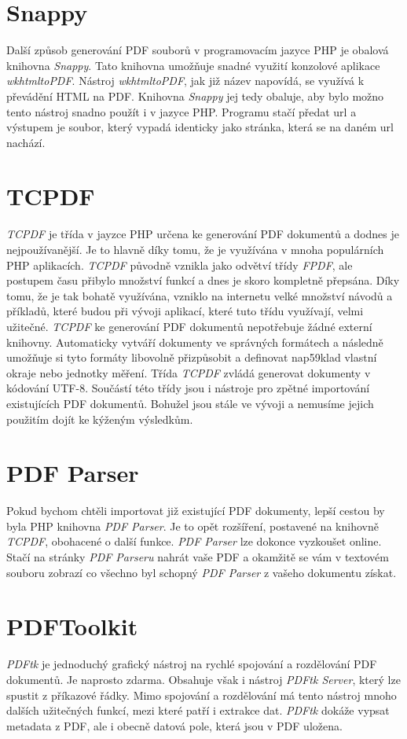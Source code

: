 \documentclass[czech,BP]{thesiskiv}
\begin{document}
\section{Snappy}
Další způsob generování PDF souborů v programovacím jazyce PHP je obalová knihovna \emph{Snappy}. Tato knihovna umožňuje snadné využití konzolové aplikace \emph{wkhtmltoPDF}. Nástroj \emph{wkhtmltoPDF}, jak již název napovídá, se využívá k převádění HTML na PDF. Knihovna \emph{Snappy} jej tedy obaluje, aby bylo možno tento nástroj snadno použít i v jazyce PHP. Programu stačí předat url a výstupem je soubor, který vypadá identicky jako stránka, která se na daném url nachází\cite{Snappy}\cite{wkhtmltoPDF}.
\section{TCPDF}
\emph{TCPDF} je třída v jayzce PHP určena ke generování PDF dokumentů a dodnes je nejpoužívanější. Je to hlavně díky tomu, že je využívána v mnoha populárních PHP aplikacích. \emph{TCPDF} původně vznikla jako odvětví třídy \emph{FPDF}, ale postupem času přibylo množství funkcí a dnes je skoro kompletně přepsána. Díky tomu, že je tak bohatě využívána, vzniklo na internetu velké množství návodů a příkladů, které budou při vývoji aplikací, které tuto třídu využívají, velmi užitečné. \emph{TCPDF} ke generování PDF dokumentů nepotřebuje žádné externí knihovny. Automaticky vytváří dokumenty ve správných formátech a následně umožňuje si tyto formáty libovolně přizpůsobit a definovat nap59klad vlastní okraje nebo jednotky měření. Třída \emph{TCPDF} zvládá generovat dokumenty v kódování UTF-8. Součástí této třídy jsou i nástroje pro zpětné importování existujících PDF dokumentů. Bohužel jsou stále ve vývoji a nemusíme jejich použitím dojít ke kýženým výsledkům. \cite{TCPDF} \cite{FPDF_Book}
\section{PDF Parser}
Pokud bychom chtěli importovat již existující PDF dokumenty, lepší cestou by byla PHP knihovna \emph{PDF Parser}. Je to opět rozšíření, postavené na knihovně \emph{TCPDF}, obohacené o další funkce. \emph{PDF Parser} lze dokonce vyzkoušet online. Stačí na stránky \emph{PDF Parseru} nahrát vaše PDF a okamžitě se vám v textovém souboru zobrazí co všechno byl schopný \emph{PDF Parser} z vašeho dokumentu získat\cite{PDF_Parser}. 
\section{PDFToolkit}
\emph{PDFtk} je jednoduchý grafický nástroj na rychlé spojování a rozdělování PDF dokumentů. Je naprosto zdarma. Obsahuje však i nástroj \emph{PDFtk Server}, který lze spustit z příkazové řádky. Mimo spojování a rozdělování má tento nástroj mnoho dalších užitečných funkcí, mezi které patří i extrakce dat. \emph{PDFtk} dokáže vypsat metadata z PDF, ale i obecně datová pole, která jsou v PDF uložena\cite{PDF_Toolkit}.
\end{document}
